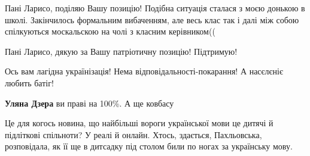 \begin{itemize}
\begin{itemize}
\end{itemize}

 

Пані Ларисо, поділяю Вашу позицію! Подібна ситуація сталася з моєю донькою в
школі. Закінчилось формальним вибаченням, але весь клас так і далі між собою
спілкуються москальскою на чолі з класним керівником((


 
Пані Ларисо, дякую за Вашу патріотичну позицію! Підтримую!

 
Ось вам лагідна українізація! Нема відповідальності-покарання! А насєлєніє любить батіг!

\begin{itemize}
 
\textbf{Уляна Дзера} ви праві на 100\%. А ще ковбасу
\end{itemize}

 

Це для когось новина, що найбільші вороги української мови це дитячі й
підліткові спільноти? У реалі й онлайн. Хтось, здається, Пахльовська,
розповідала, як її ще в дитсадку під столом били по ногах за українську мову.

\begin{itemize}
 

\end{itemize}
\end{itemize}
